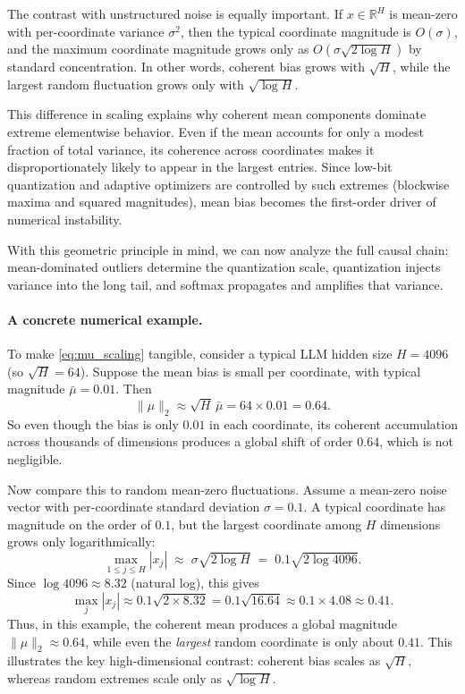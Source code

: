 The contrast with unstructured noise is equally important.
If $x\in\mathbb{R}^H$ is mean-zero with per-coordinate variance $\sigma^2$,
then the typical coordinate magnitude is $O(\sigma)$, and the maximum coordinate
magnitude grows only as $O(\sigma\sqrt{2\log H})$ by standard concentration.
In other words, coherent bias grows with $\sqrt{H}$, while the largest random
fluctuation grows only with $\sqrt{\log H}$.

This difference in scaling explains why coherent mean components dominate extreme
elementwise behavior.
Even if the mean accounts for only a modest fraction of total variance,
its coherence across coordinates makes it disproportionately likely to appear in
the largest entries.
Since low-bit quantization and adaptive optimizers are controlled by such
extremes (blockwise maxima and squared magnitudes), mean bias becomes the
first-order driver of numerical instability.

With this geometric principle in mind, we can now analyze the full causal chain:
mean-dominated outliers determine the quantization scale, quantization injects
variance into the long tail, and softmax propagates and amplifies that variance.

\paragraph{A concrete numerical example.}
To make \eqref{eq:mu_scaling} tangible, consider a typical LLM hidden size
$H=4096$ (so $\sqrt{H}=64$). Suppose the mean bias is small per coordinate,
with typical magnitude $\bar{\mu}=0.01$. Then
\[
\|\mu\|_2 \approx \sqrt{H}\,\bar{\mu} = 64 \times 0.01 = 0.64.
\]
So even though the bias is only $0.01$ in each coordinate, its coherent
accumulation across thousands of dimensions produces a global shift of order
$0.64$, which is not negligible.

Now compare this to random mean-zero fluctuations.
Assume a mean-zero noise vector with per-coordinate standard deviation
$\sigma=0.1$. A typical coordinate has magnitude on the order of $0.1$, but the
largest coordinate among $H$ dimensions grows only logarithmically:
\[
\max_{1\le j\le H} |x_j|
\;\approx\;
\sigma \sqrt{2\log H}
\;=\;
0.1 \sqrt{2\log 4096}.
\]
Since $\log 4096 \approx 8.32$ (natural log), this gives
\[
\max_j |x_j|
\approx
0.1 \sqrt{2\times 8.32}
=
0.1 \sqrt{16.64}
\approx
0.1 \times 4.08
\approx
0.41.
\]
Thus, in this example, the coherent mean produces a global magnitude
$\|\mu\|_2 \approx 0.64$, while even the \emph{largest} random coordinate is
only about $0.41$.
This illustrates the key high-dimensional contrast:
coherent bias scales as $\sqrt{H}$, whereas random extremes scale only as
$\sqrt{\log H}$.

